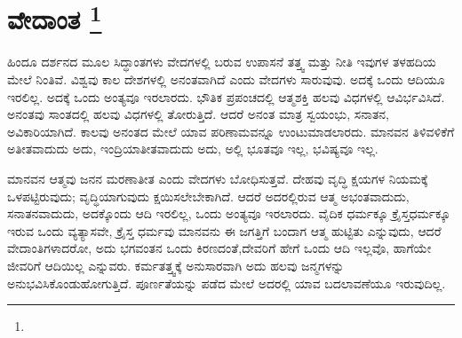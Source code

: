 
\vspace{-0.6cm}

\chapter[ವೇದಾಂತ ]{ವೇದಾಂತ \protect\footnote{}}

ಹಿಂದೂ ದರ್ಶನದ ಮೂಲ ಸಿದ್ಧಾಂತಗಳು ವೇದಗಳಲ್ಲಿ ಬರುವ ಉಪಾಸನೆ ತತ್ತ್ವ ಮತ್ತು ನೀತಿ ಇವುಗಳ ತಳಹದಿಯ ಮೇಲೆ ನಿಂತಿವೆ. ವಿಶ್ವವು ಕಾಲ ದೇಶಗಳಲ್ಲಿ ಅನಂತವಾಗಿದೆ ಎಂದು ವೇದಗಳು ಸಾರುವುವು. ಅದಕ್ಕೆ ಒಂದು ಆದಿಯೂ ಇರಲಿಲ್ಲ. ಅದಕ್ಕೆ ಒಂದು ಅಂತ್ಯವೂ ಇರಲಾರದು. ಭೌತಿಕ ಪ್ರಪಂಚದಲ್ಲಿ ಆತ್ಮಶಕ್ತಿ ಹಲವು ವಿಧಗಳಲ್ಲಿ ಆವಿರ್ಭವಿಸಿದೆ. ಅನಂತವು ಸಾಂತದಲ್ಲಿ ಹಲವು ವಿಧಗಳಲ್ಲಿ ತೋರುತ್ತಿದೆ. ಆದರೆ ಅನಂತ ಮಾತ್ರ ಸ್ವಯಂಭು, ಸನಾತನ, ಅವಿಕಾರಿಯಾಗಿದೆ. ಕಾಲವು ಅನಂತದ ಮೇಲೆ ಯಾವ ಪರಿಣಾಮವನ್ನೂ ಉಂಟುಮಾಡಲಾರದು. ಮಾನವನ ತಿಳಿವಳಿಕೆಗೆ ಅತೀತವಾದುದು ಅದು, ಇಂದ್ರಿಯಾತೀತವಾದುದು ಅದು, ಅಲ್ಲಿ ಭೂತವೂ ಇಲ್ಲ, ಭವಿಷ್ಯವೂ ಇಲ್ಲ.

ಮಾನವನ ಆತ್ಮವು ಜನನ ಮರಣಾತೀತ ಎಂದು ವೇದಗಳು ಬೋಧಿಸುತ್ತವೆ. ದೇಹವು ವೃದ್ಧಿ ಕ್ಷಯಗಳ ನಿಯಮಕ್ಕೆ ಒಳಪಟ್ಟಿರುವುದು; ವೃದ್ಧಿಯಾಗುವುದು ಕ್ಷಯಿಸಲೇಬೇಕಾಗಿದೆ. ಆದರೆ ಅದರಲ್ಲಿರುವ ಆತ್ಮ ಅಭಂತವಾದುದು, ಸನಾತನವಾದುದು, ಅದಕ್ಕೊಂದು ಆದಿ ಇರಲಿಲ್ಲ, ಒಂದು ಅಂತ್ಯವೂ ಇರಲಾರದು. ವೈದಿಕ ಧರ್ಮಕ್ಕೂ ಕ್ರೈಸ್ತಧರ್ಮಕ್ಕೂ ಇರುವ ಒಂದು ವ್ಯತ್ಯಾಸವೇ, ಕ್ರೈಸ್ತ ಧರ್ಮವು ಮಾನವನು ಈ ಜಗತ್ತಿಗೆ ಬಂದಾಗ ಆತ್ಮ ಹುಟ್ಟಿತು ಎನ್ನುವುದು, ಆದರೆ ವೇದಾಂತಿಗಳಾದರೋ, ಅದು ಭಗವಂತನ ಒಂದು ಕಿರಣದಂತೆ,\break ದೇವರಿಗೆ ಹೇಗೆ ಒಂದು ಆದಿ ಇಲ್ಲವೊ, ಹಾಗೆಯೇ ಜೀವರಿಗೆ ಆದಿಯಿಲ್ಲ ಎನ್ನುವರು. ಕರ್ಮತತ್ತ್ವಕ್ಕೆ ಅನುಸಾರವಾಗಿ ಅದು ಹಲವು ಜನ್ಮಗಳನ್ನು ಅನುಭವಿಸಿಕೊಂಡು\break ಹೋಗುತ್ತಿದೆ. ಪೂರ್ಣತೆಯನ್ನು ಪಡೆದ ಮೇಲೆ ಅದರಲ್ಲಿ ಯಾವ ಬದಲಾವಣೆಯೂ ಇರುವುದಿಲ್ಲ.

